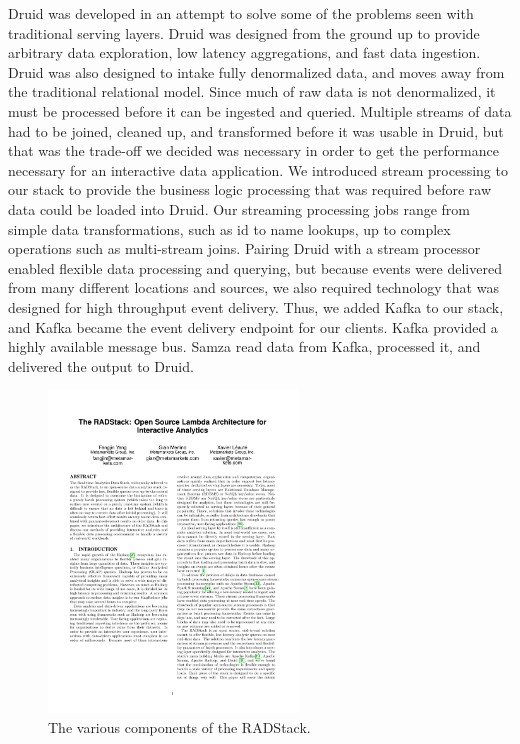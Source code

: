 \documentclass{vldb}
\begin{document}
Druid was developed in an attempt to solve some of the problems seen with
traditional serving layers. Druid was designed from the ground up to provide
arbitrary data exploration, low latency aggregations, and fast data ingestion.
Druid was also designed to intake fully denormalized data, and moves away from
the traditional relational model. Since much of raw data is not denormalized,
it must be processed before it can be ingested and queried. Multiple streams of
data had to be joined, cleaned up, and transformed before it was usable in
Druid, but that was the trade-off we decided was necessary in order to get the
performance necessary for an interactive data application. We introduced stream
processing to our stack to provide the business logic processing that was
required before raw data could be loaded into Druid. Our streaming processing
jobs range from simple data transformations, such as id to name lookups, up to
complex operations such as multi-stream joins. Pairing Druid with a stream
processor enabled flexible data processing and querying, but because events
were delivered from many different locations and sources, we also required
technology that was designed for high throughput event delivery. Thus, we added
Kafka to our stack, and Kafka became the event delivery endpoint for our
clients. Kafka provided a highly available message bus. Samza read data from
Kafka, processed it, and delivered the output to Druid. 

\begin{figure}
\centering
\includegraphics[width = 2.6in]{radstack}
\caption{The various components of the RADStack.}
\label{fig:radstack}
\end{figure}
\end{document}
